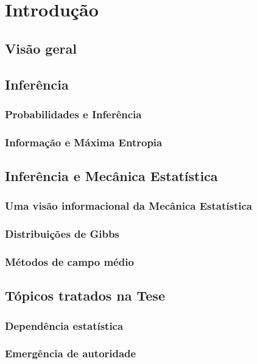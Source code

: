 \chapter{Introdução}

\section{Visão geral}

\section{Inferência}
\subsection{Probabilidades e Inferência}
\subsection{Informação e Máxima Entropia}

\section{Inferência e Mecânica Estatística}
\subsection{Uma visão informacional da Mecânica Estatística}
\subsection{Distribuições de Gibbs}
\subsection{Métodos de campo médio}

\section{Tópicos tratados na Tese}
\subsection{Dependência estatística}
\subsection{Emergência de autoridade}